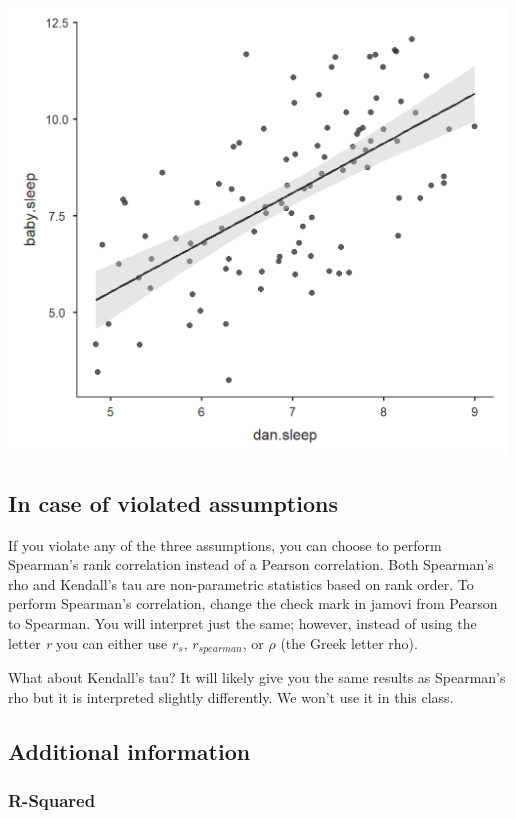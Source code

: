 \documentclass[
]{book}
\begin{document}
\includegraphics[width=5.20833in,height=\textheight]{images/08-correlation/correlation-plot1.png}

\hypertarget{in-case-of-violated-assumptions-7}{%
\subsection{In case of violated assumptions}\label{in-case-of-violated-assumptions-7}}

If you violate any of the three assumptions, you can choose to perform Spearman's rank correlation instead of a Pearson correlation. Both Spearman's rho and Kendall's tau are non-parametric statistics based on rank order. To perform Spearman's correlation, change the check mark in jamovi from Pearson to Spearman. You will interpret just the same; however, instead of using the letter \emph{r} you can either use \(r_s\), \(r_{spearman}\), or \(\rho\) (the Greek letter rho).

What about Kendall's tau? It will likely give you the same results as Spearman's rho but it is interpreted slightly differently. We won't use it in this class.

\hypertarget{additional-information-4}{%
\subsection{Additional information}\label{additional-information-4}}

\hypertarget{r-squared}{%
\subsubsection{R-Squared}\label{r-squared}}
\end{document}
